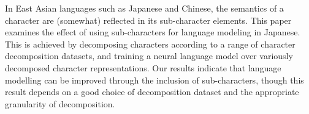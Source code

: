 In East Asian languages such as Japanese and Chinese, the semantics of a character are (somewhat) reflected in its sub-character elements. This paper examines the effect of using sub-characters for language modeling in Japanese. This is achieved by decomposing characters according to a range of character decomposition datasets, and training a neural language model over variously decomposed character representations. Our results indicate that language modelling can be improved through the inclusion of sub-characters, though this result depends on a good choice of decomposition dataset and the appropriate granularity of decomposition.
